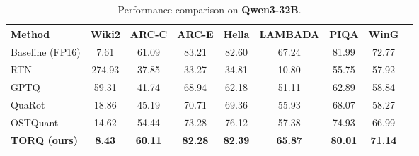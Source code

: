 \begin{table}[h!]
\centering
\caption{Performance comparison on \textbf{Qwen3-32B}.}
\label{tab:qwen3_32b_full}
\begin{tabular}{lcccccccc}
\toprule
\textbf{Method} & \textbf{Wiki2} & \textbf{ARC-C} & \textbf{ARC-E} & \textbf{Hella} & \textbf{LAMBADA} & \textbf{PIQA} & \textbf{WinG} \\
\midrule
Baseline (FP16) & 7.61 & 61.09 & 83.21 & 82.60 & 67.24 & 81.99 & 72.77 \\
\midrule
RTN & 274.93 & 37.85 & 33.27 & 34.81 & 10.80 & 55.75 & 57.92 \\
GPTQ & 59.31 & 41.74 & 68.94 & 62.18 & 51.11 & 62.89 & 58.84 \\
QuaRot & 18.86 & 45.19 & 70.71 & 69.36 & 55.93 & 68.07 & 58.27 \\
OSTQuant & 14.62 & 54.44 & 73.28 & 76.12 & 57.38 & 74.93 & 66.99 \\
\textbf{TORQ (ours)} & \textbf{8.43} & \textbf{60.11} & \textbf{82.28} & \textbf{82.39} & \textbf{65.87} & \textbf{80.01} & \textbf{71.14} \\
\bottomrule
\end{tabular}
\end{table}